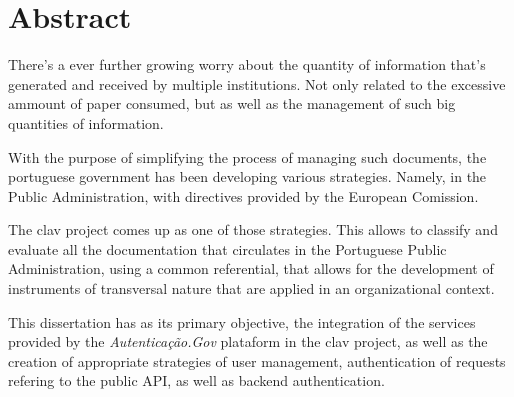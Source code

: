 \chapter*{Abstract}

There's a ever further growing worry about the quantity of information that's generated and received by multiple institutions. Not only related to the excessive ammount of paper consumed, but as well as the management of such big quantities of information.

With the purpose of simplifying the process of managing such documents, the portuguese government has been developing various strategies. Namely, in the Public Administration, with directives provided by the European Comission.

The \gls{clav} project comes up as one of those strategies. This allows to classify and evaluate all the documentation that circulates in the Portuguese Public Administration, using a common referential, that allows for the development of instruments of transversal nature that are applied in an organizational context.

This dissertation has as its primary objective, the integration of the services provided by the \emph{Autenticação.Gov} plataform in the \gls{clav} project, as well as the creation of appropriate strategies of user management, authentication of requests refering to the public API, as well as  backend authentication.